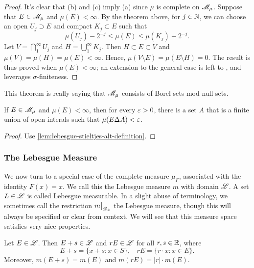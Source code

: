 \documentclass[12pt]{article} %
\begin{document}
\begin{proof}
    It's clear that (b) and (c) imply (a) since $\mu$ is complete on $\mathscr{M}_\mu$. Suppose that $E \in \mathscr{M}_\mu$ and $\mu(E) < \infty$. By the theorem above, for $j \in \mathbb{N}$, we can choose an open $U_j \supset E$ and compact $K_j \subset E$ such that \[\mu(U_j) - 2^{-j} \leq \mu(E) \leq \mu(K_j) + 2^{-j}.\]
    Let $V = \bigcap_1^\infty U_j$ and $H = \bigcup_1^\infty K_j$. Then $H \subset E \subset V$ and $\mu(V) = \mu(H) = \mu(E) < \infty$. Hence, $\mu(V \setminus E) = \mu(E \setminus H) = 0$. The result is thus proved when $\mu(E) < \infty$; an extension to the general case is left to \citet[Exercise~25]{folland1999real}, and leverages $\sigma$-finiteness.
\end{proof}

\begin{remark}
    This theorem is really saying that $\mathscr{M}_\mu$ consists of Borel sets mod null sets.
\end{remark}

\begin{proposition}\label{prop:lebesgue-stieltjes-symmetric-difference}
    If $E \in \mathscr{M}_\mu$ and $\mu(E) < \infty$, then for every $\varepsilon > 0$, there is a set $A$ that is a finite union of open interals such that $\mu(E \Delta A) < \varepsilon$.
\end{proposition}

\begin{proof}
    Use \cref{lem:lebesgue-stieltjes-alt-definition}.
\end{proof}

\subsubsection{The Lebesgue Measure}

We now turn to a special case of the complete measure $\mu_F$, associated with the identity $F(x) = x$. We call this the Lebesgue measure $m$ with domain $\mathscr{L}$. A set $L \in \mathscr{L}$ is called Lebesgue measurable. In a slight abuse of terminology, we sometimes call the restriction $\restr{m}{\SB_\R}$ the Lebesgue measure, though this will always be specified or clear from context. We will see that this measure space satisfies very nice properties.

\begin{theorem}
    Let $E \in \mathscr{L}$. Then $E + s \in \mathscr{L}$ and $rE \in \mathscr{L}$ for all $r, s \in \mathbb{R}$, where \[E + s = \{x + s : x \in S\}, \ \ \ \ rE = \{r \cdot x : x \in E\}.\] Moreover, $m(E + s) = m(E)$ and $m(rE) = |r| \cdot m(E)$.
\end{theorem}
\end{document}
